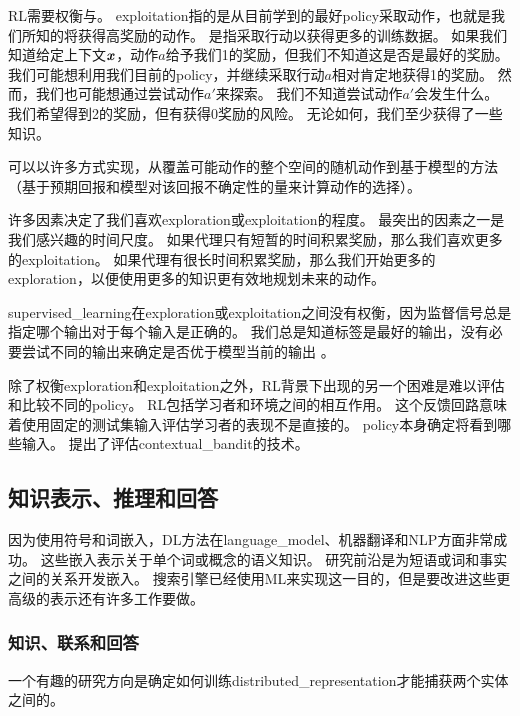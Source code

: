 
\gls{RL}需要权衡与。
\gls{exploitation}指的是从目前学到的最好\gls{policy}采取动作，也就是我们所知的将获得高奖励的动作。
是指采取行动以获得更多的训练数据。
如果我们知道给定上下文$\boldsymbol{\mathit{x}}$，动作$a$给予我们1的奖励，但我们不知道这是否是最好的奖励。
我们可能想利用我们目前的\gls{policy}，并继续采取行动$a$相对肯定地获得1的奖励。
然而，我们也可能想通过尝试动作$a'$来探索。
我们不知道尝试动作$a'$会发生什么。
我们希望得到2的奖励，但有获得0奖励的风险。
无论如何，我们至少获得了一些知识。

可以以许多方式实现，从覆盖可能动作的整个空间的随机动作到基于模型的方法（基于预期回报和模型对该回报不确定性的量来计算动作的选择）。

许多因素决定了我们喜欢\gls{exploration}或\gls{exploitation}的程度。
最突出的因素之一是我们感兴趣的时间尺度。
如果代理只有短暂的时间积累奖励，那么我们喜欢更多的\gls{exploitation}。
如果代理有很长时间积累奖励，那么我们开始更多的\gls{exploration}，以便使用更多的知识更有效地规划未来的动作。

\gls{supervised_learning}在\gls{exploration}或\gls{exploitation}之间没有权衡，因为监督信号总是指定哪个输出对于每个输入是正确的。
我们总是知道标签是最好的输出，没有必要尝试不同的输出来确定是否优于模型当前的输出 。

除了权衡\gls{exploration}和\gls{exploitation}之外，\gls{RL}背景下出现的另一个困难是难以评估和比较不同的\gls{policy}。
\gls{RL}包括学习者和环境之间的相互作用。
这个反馈回路意味着使用固定的测试集输入评估学习者的表现不是直接的。
\gls{policy}本身确定将看到哪些输入。
\citet{Dudik-2011} 提出了评估\gls{contextual_bandit}的技术。


\subsection{知识表示、推理和回答}
\label{sec:knowledge_representation_reasoning and_question_answering}
因为使用符号\citep{Rumelhart86b-small}和词嵌入\citep{Deerwester90,BenDucVin01-small}，\gls{DL}方法在\gls{language_model}、机器翻译和\gls{NLP}方面非常成功。
这些嵌入表示关于单个词或概念的语义知识。
研究前沿是为短语或词和事实之间的关系开发嵌入。
搜索引擎已经使用\gls{ML}来实现这一目的，但是要改进这些更高级的表示还有许多工作要做。

\subsubsection{知识、联系和回答}
一个有趣的研究方向是确定如何训练\gls{distributed_representation}才能捕获两个实体之间的。

